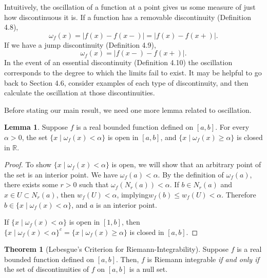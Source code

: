 \documentclass{article}
\newcommand{\R}{\mathbb{R}}
\newcommand{\abs}[1]{\left\lvert#1\right\rvert}
\theoremstyle{definition}
\newtheorem{theorem}{Theorem}[section]
\newtheorem{lemma}{Lemma}[section]
\begin{document}
	Intuitively, the oscillation of a function at a point gives us some measure of just how discontinuous it is. If a function has a removable discontinuity (Definition 4.8), $$  \omega_f(x) =\abs{f(x)-f(x-)} = \abs{f(x)-f(x+)}.$$ If we have a jump discontinuity (Definition 4.9), $$\omega_f(x)=\abs{f(x-)-f(x+)}.$$  In the event of an essential discontinuity (Definition 4.10) the oscillation corresponds to the degree to which the limits fail to exist. It may be helpful to go back to Section 4.6, consider examples of each type of discontinuity, and then calculate the oscillation at those discontinuities. 
	
	Before stating our main result, we need one more lemma related to oscillation. 
	\begin{lemma}
		Suppose $ f $ is a real bounded function defined on $ [a,b] $. For every $ \alpha > 0 $, the set $ \{x\mid\omega_f(x)<\alpha\} $ is open in $ [a,b] $, and $ \{x\mid\omega_f(x)\ge\alpha\} $ is closed in $ \R $.
	\end{lemma}
	\begin{proof}
		To show $ \{x\mid\omega_f(x)<\alpha\} $ is open, we will show that an arbitrary point of the set is an interior point. We have $ \omega_f(a)<\alpha $. By the definition of $ \omega_f(a) $, there exists some $ r>0 $ such that $ \omega_f(N_r(a))<\alpha $. If $ b\in N_r(a) $ and $ x\in U\subset N_r(a) $, then $ w_f(U)<\alpha $, implying$ w_f(b)\le w_f(U)<\alpha$.  Therefore $ b\in \{x\mid\omega_f(x)<\alpha\} $, and $ a $ is an interior point. 
		
		If   $ \{x\mid\omega_f(x)<\alpha\} $  is open in $ [1,b] $, then $ \{x\mid\omega_f(x)<\alpha\} ^c=\{x\mid\omega_f(x)\ge\alpha\}  $ is closed in $ [a,b] $.  
	\end{proof}
	\begin{theorem}[Lebesgue's Criterion for Riemann-Integrability]
		Suppose $ f $ is a real bounded function defined on $ [a,b] $. Then, $ f $ is Riemann integrable \textit{if and only if} the set of discontinuities of $ f $ on $ [a,b] $ is a null set.
	\end{theorem}
\end{document}
